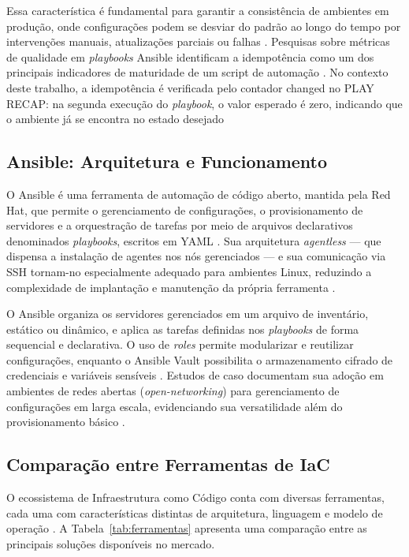 \documentclass[12pt]{article}
\begin{document}
Essa característica é fundamental para garantir a consistência de
ambientes em produção, onde configurações podem se desviar do padrão
ao longo do tempo por intervenções manuais, atualizações parciais ou
falhas \cite{redhat2022}. Pesquisas sobre métricas de qualidade em
\textit{playbooks} Ansible identificam a idempotência como um dos principais indicadores de maturidade de um script de automação \cite{ansiblemetrics}. No contexto deste trabalho, a idempotência é verificada pelo contador changed no PLAY RECAP: na segunda execução do \textit{playbook}, o valor esperado é zero, indicando que o ambiente já se encontra no estado desejado

\subsection{Ansible: Arquitetura e Funcionamento}

O Ansible é uma ferramenta de automação de código aberto, mantida pela
Red Hat, que permite o gerenciamento de configurações, o provisionamento
de servidores e a orquestração de tarefas por meio de arquivos
declarativos denominados \textit{playbooks}, escritos em YAML
\cite{redhat2022}. Sua arquitetura \textit{agentless} --- que dispensa
a instalação de agentes nos nós gerenciados --- e sua comunicação via
SSH tornam-no especialmente adequado para ambientes Linux, reduzindo
a complexidade de implantação e manutenção da própria ferramenta
\cite{alcidesmaya}.

O Ansible organiza os servidores gerenciados em um arquivo de inventário,
estático ou dinâmico, e aplica as tarefas definidas nos
\textit{playbooks} de forma sequencial e declarativa. O uso de
\textit{roles} permite modularizar e reutilizar configurações, enquanto
o Ansible Vault possibilita o armazenamento cifrado de credenciais e
variáveis sensíveis \cite{ansible_docs}. Estudos de caso documentam sua
adoção em ambientes de redes abertas (\textit{open-networking}) para
gerenciamento de configurações em larga escala, evidenciando sua
versatilidade além do provisionamento básico \cite{ieee_opennet}.

\subsection{Comparação entre Ferramentas de IaC}

O ecossistema de Infraestrutura como Código conta com diversas
ferramentas, cada uma com características distintas de arquitetura,
linguagem e modelo de operação \cite{ufcg_comparativo}. A
Tabela~\ref{tab:ferramentas} apresenta uma comparação entre as principais
soluções disponíveis no mercado.
\end{document}
